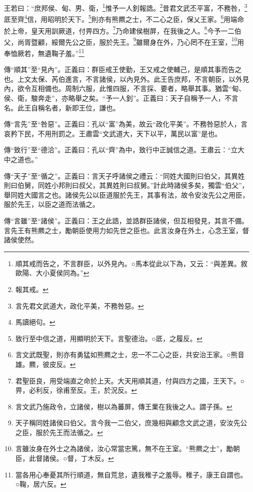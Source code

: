 王若曰：“庶邦侯、甸、男、衛，\footnote{順其戒而告之，不言群臣，以外見內。○馬本從此以下為，又云：“與差異。敘歐陽、大小夏侯同為。”}惟予一人釗報誥。\footnote{報其戒。}昔君文武丕平富，不務咎，\footnote{言先君文武道大，政化平美，不務咎惡。}厎至齊\footnote{馬讀絕句。}信，用昭明於天下。\footnote{致行至中信之道，用顯明於天下。言聖德治。○厎，之履反。}則亦有熊羆之士，不二心之臣，保乂王家。\footnote{言文武既聖，則亦有勇猛如熊羆之士，忠一不二心之臣，共安治王家。○熊音雄。羆，彼皮反。}用端命於上帝，皇天用訓厥道，付畀四方。\footnote{君聖臣良，用受端直之命於上天。大天用順其道，付與四方之國，王天下。○畀，必利反，徐甫至反。王，於況反。}乃命建侯樹屏，在我後之人。\footnote{言文武乃施政令，立諸侯，樹以為蕃屏，傳王業在我後之人。謂子孫。}今予一二伯父，尚胥暨顧，綏爾先公之臣，服於先王。\footnote{天子稱同姓諸侯曰伯父。言今我一二伯父，庶幾相與顧念文武之道，安汝先公之臣，服於先王而法循之。}雖爾身在外，乃心罔不在王室，\footnote{言雖汝身在外士之為諸侯，汝心常當忠篤，無不在王室。“熊羆之士”，勵朝臣，此督諸侯。○督，丁木反。}用奉恤厥若，無遺鞠子羞。”\footnote{當各用心奉憂其所行順道，無自荒怠，遺我稚子之羞辱。稚子，康王自謂也。○鞠，居六反。}


{\noindent\zhuan{}\fzbyks 傳“順其”至“見內”。正義曰：群臣戒王使勤，王又戒之使輔己，是順其事而告之也。上文太保、芮伯進言，不言諸侯，以內見外。此王告庶邦，不言朝臣，以外見內，欲令互相備也。周制六服，此惟四服，不言採、要者，略舉其事。猶雲“甸、侯、衛，駿奔走”，亦略舉之矣。“予一人釗”。正義曰：天子自稱予一人，不言名。此王自稱名者，新即王位，謙也。 \par}

{\noindent\zhuan{}\fzbyks 傳“言先”至“咎惡”。正義曰：孔以“富”為美，故云“政化平美”。不務咎惡於人，言哀矜下民，不用刑罰之。王肅雲“文武道大，天下以平，萬民以富”是也。 \par}

{\noindent\zhuan{}\fzbyks 傳“致行”至“德洽”。正義曰：孔以“齊”為中，致行中正誠信之道。王肅云：“立大中之道也。” \par}

{\noindent\zhuan{}\fzbyks 傳“天子”至“循之”。正義曰：言天子呼諸侯之禮云：“同姓大國則曰伯父，其異姓則曰伯舅，同姓小邦則曰叔父，其異姓則曰叔舅。”計此時諸侯多矣，獨雲“伯父”，舉同姓大國言之也。諸侯先公以臣道服於先王，其事有法，故令安汝先公之用臣，服於先王，以臣之道而法循之。 \par}

{\noindent\zhuan{}\fzbyks 傳“言雖”至“諸侯”。正義曰：王之此誥，並誥群臣諸侯，但互相發見，其言不備。言先王有熊羆之士，勵朝臣使用力如先世之臣也。此言汝身在外土，心念王室，督諸侯使然。 \par}

